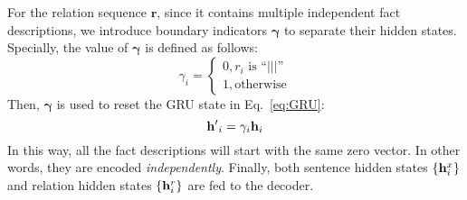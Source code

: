 \documentclass[letterpaper]{article} \usepackage{aaai18}  \usepackage{times}  \usepackage{helvet}  \usepackage{courier}  \usepackage{url}  \usepackage{graphicx}  \usepackage{amsfonts}
\begin{document}
	For the relation sequence $\mathbf{r}$, since it contains multiple independent fact descriptions, we introduce boundary indicators $\mathbf{\gamma}$ to separate their hidden states.
	Specially, the value of $\mathbf{\gamma}$ is defined as follows:
	\begin{equation} \label{eq:0_1}
		{\gamma _i} = \left\{ {\begin{array}{*{20}{l}}
				{0,{r_i} \text{ is ``$|||$''}}\\
				{1,\text{otherwise}}
		\end{array}} \right.
	\end{equation}
	Then, ${\mathbf{\gamma}}$ is used to reset the GRU state in Eq.~\ref{eq:GRU}:
	\begin{equation} \label{eq:reset}
		{\bf{h'}}_i = {\gamma _i}{{\bf{h}}_i}
	\end{equation}
	In this way, all the fact descriptions will start with the same zero vector.
	In other words, they are encoded \textit{independently}.
	Finally, both sentence hidden states $\{ {\bf{h}}_i^x\} $ and relation hidden states $\{ {\bf{h}}_i^r\} $ are fed to the decoder. 
	
\end{document}
